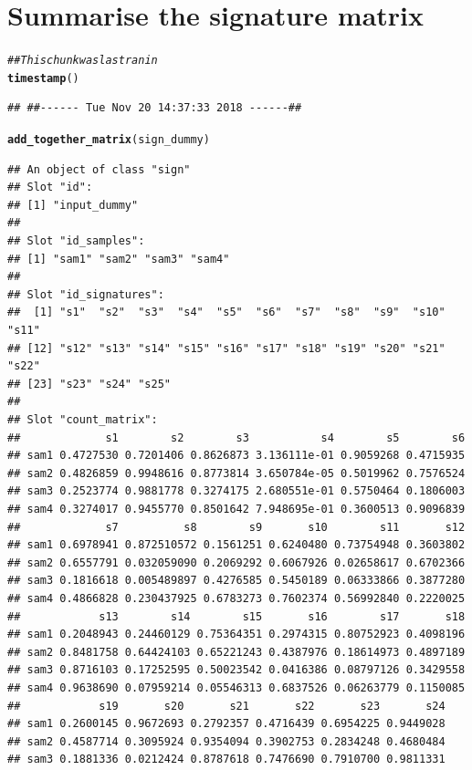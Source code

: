 \documentclass{article}\usepackage[]{graphicx}\usepackage[]{color}
\makeatletter
\newcommand{\hlcom}[1]{\textcolor[rgb]{0.678,0.584,0.686}{\textit{#1}}}%
\newcommand{\hlstd}[1]{\textcolor[rgb]{0.345,0.345,0.345}{#1}}%
\newcommand{\hlkwd}[1]{\textcolor[rgb]{0.737,0.353,0.396}{\textbf{#1}}}%
\newenvironment{kframe}{%
 \def\at@end@of@kframe{}%
 \ifinner\ifhmode%
  \def\at@end@of@kframe{\end{minipage}}%
  \begin{minipage}{\columnwidth}%
 \fi\fi%
 \def\FrameCommand##1{\hskip\@totalleftmargin \hskip-\fboxsep
 \colorbox{shadecolor}{##1}\hskip-\fboxsep
     \hskip-\linewidth \hskip-\@totalleftmargin \hskip\columnwidth}%
 \MakeFramed {\advance\hsize-\width
   \@totalleftmargin\z@ \linewidth\hsize
   \@setminipage}}%
 {\par\unskip\endMakeFramed%
 \at@end@of@kframe}
\newenvironment{knitrout}{}{} %
\makeatother
\begin{document}
\section{Summarise the signature matrix}
\begin{knitrout}
\color{fgcolor}\begin{kframe}
\begin{alltt}
\hlcom{## This chunk was last ran in}
\hlkwd{timestamp}\hlstd{()}
\end{alltt}
\begin{verbatim}
## ##------ Tue Nov 20 14:37:33 2018 ------##
\end{verbatim}
\begin{alltt}
\hlkwd{add_together_matrix}\hlstd{(sign_dummy)}
\end{alltt}
\begin{verbatim}
## An object of class "sign"
## Slot "id":
## [1] "input_dummy"
## 
## Slot "id_samples":
## [1] "sam1" "sam2" "sam3" "sam4"
## 
## Slot "id_signatures":
##  [1] "s1"  "s2"  "s3"  "s4"  "s5"  "s6"  "s7"  "s8"  "s9"  "s10" "s11"
## [12] "s12" "s13" "s14" "s15" "s16" "s17" "s18" "s19" "s20" "s21" "s22"
## [23] "s23" "s24" "s25"
## 
## Slot "count_matrix":
##             s1        s2        s3           s4        s5        s6
## sam1 0.4727530 0.7201406 0.8626873 3.136111e-01 0.9059268 0.4715935
## sam2 0.4826859 0.9948616 0.8773814 3.650784e-05 0.5019962 0.7576524
## sam3 0.2523774 0.9881778 0.3274175 2.680551e-01 0.5750464 0.1806003
## sam4 0.3274017 0.9455770 0.8501642 7.948695e-01 0.3600513 0.9096839
##             s7          s8        s9       s10        s11       s12
## sam1 0.6978941 0.872510572 0.1561251 0.6240480 0.73754948 0.3603802
## sam2 0.6557791 0.032059090 0.2069292 0.6067926 0.02658617 0.6702366
## sam3 0.1816618 0.005489897 0.4276585 0.5450189 0.06333866 0.3877280
## sam4 0.4866828 0.230437925 0.6783273 0.7602374 0.56992840 0.2220025
##            s13        s14        s15       s16        s17       s18
## sam1 0.2048943 0.24460129 0.75364351 0.2974315 0.80752923 0.4098196
## sam2 0.8481758 0.64424103 0.65221243 0.4387976 0.18614973 0.4897189
## sam3 0.8716103 0.17252595 0.50023542 0.0416386 0.08797126 0.3429558
## sam4 0.9638690 0.07959214 0.05546313 0.6837526 0.06263779 0.1150085
##            s19       s20       s21       s22       s23       s24
## sam1 0.2600145 0.9672693 0.2792357 0.4716439 0.6954225 0.9449028
## sam2 0.4587714 0.3095924 0.9354094 0.3902753 0.2834248 0.4680484
## sam3 0.1881336 0.0212424 0.8787618 0.7476690 0.7910700 0.9811331

\end{verbatim}
\end{kframe}
\end{knitrout}
\end{document}
